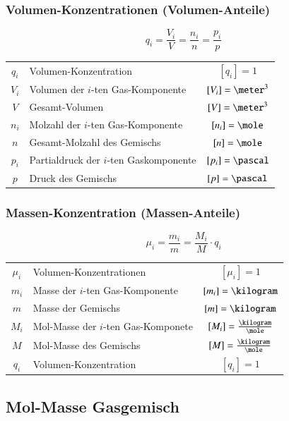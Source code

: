 \subsubsection{Volumen-Konzentrationen (Volumen-Anteile)}

\vspace{-0.2cm}

$$ \boxed{  q_i = \frac{V_i}{V} = \frac{n_i}{n} = \frac{p_i}{p} } $$


\begin{tabular}{c l c}
	$q_i$ 	& Volumen-Konzentration						& $[q_i] = 1$ 			\\
	$V_i$ 	& Volumen der $i$-ten Gas-Komponente 		& $[V_i] = \meter^3$ 	\\
	$V$ 	& Gesamt-Volumen	 						& $[V] = \meter^3$ 		\\
	$n_i$ 	& Molzahl der $i$-ten Gas-Komponente 		& $[n_i] = \mole$ 		\\
	$n$ 	& Gesamt-Molzahl des Gemischs 				& $[n] = \mole$ 		\\
	$p_i$ 	& Partialdruck der $i$-ten Gaskomponente 	& $[p_i] = \pascal$ 	\\
	$p$ 	& Druck des Gemischs 						& $[p] = \pascal$
\end{tabular}


\subsubsection{Massen-Konzentration (Massen-Anteile)}

\vspace{-0.2cm}

$$ \boxed{ \mu_i = \frac{m_i}{m} = \frac{M_i}{M} \cdot q_i } $$

\renewcommand{\arraystretch}{1.3}
\begin{tabular}{c l c}
	$\mu_i$ & Volumen-Konzentrationen 				& $[\mu_i] = 1$ 					\\
	$m_i$ 	& Masse der $i$-ten Gas-Komponente 		& $[m_i] = \kilogram$ 				\\
	$m$ 	& Masse der Gemischs 					& $[m] = \kilogram$ 				\\
	$M_i$ 	& Mol-Masse der $i$-ten Gas-Komponete 	& $[M_i] = \frac{\kilogram}{\mole}$ \\
	$M$ 	& Mol-Masse des Gemischs 				& $[M] = \frac{\kilogram}{\mole}$ 	\\
	$q_i$ 	& Volumen-Konzentration					& $[q_i] = 1$
\end{tabular}
\renewcommand{\arraystretch}{1}


\subsection{Mol-Masse Gasgemisch}

